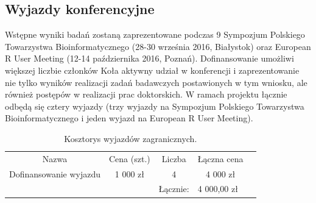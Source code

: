 \documentclass{article}
\begin{document}
\subsection{Wyjazdy konferencyjne}

Wstępne wyniki badań zostaną zaprezentowane podczas 9 Sympozjum Polskiego 
Towarzystwa Bioinformatycznego (28-30 września 2016, Białystok) oraz European R 
User Meeting (12-14 października 2016, Poznań). Dofinansowanie 
umożliwi większej liczbie członków Koła aktywny udział w konferencji i 
zaprezentowanie nie tylko wyników realizacji zadań badawczych postawionych w tym 
wniosku, ale również postępów w realizacji prac doktorskich. W ramach projektu 
łącznie odbędą się cztery wyjazdy (trzy wyjazdy na Sympozjum Polskiego 
Towarzystwa Bioinformatycznego i jeden wyjazd na European R 
User Meeting).

\begin{table}[!htbp]
\centering
\caption{Kosztorys wyjazdów zagranicznych.}
\begin{tabular}{lllll}
\cline{1-4}
\multicolumn{1}{|c|}{Nazwa}                     & \multicolumn{1}{c|}{Cena (szt.)} & \multicolumn{1}{c|}{Liczba} & \multicolumn{1}{c|}{Łączna cena} &  \\ \cline{1-4}
\multicolumn{1}{|c|}{Dofinansowanie wyjazdu} & \multicolumn{1}{c|}{1 000 zł}    
 & \multicolumn{1}{c|}{4}      & \multicolumn{1}{c|}{4 000 zł}     &  \\ 
\cline{1-4}
                                                &                                
  & Łącznie:                    & 4 000,00 zł                          & 
\end{tabular}
\end{table}


 

\end{document}
